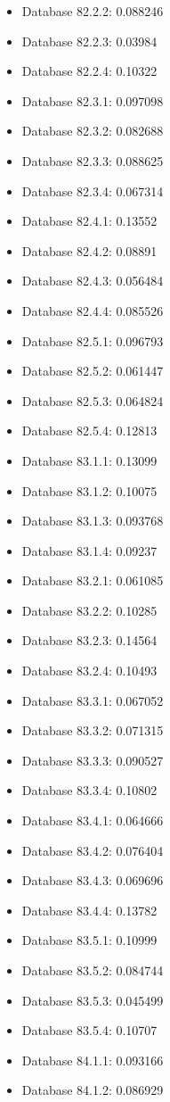 \begin{itemize}
\item Database 82.2.2: 0.088246
\item Database 82.2.3: 0.03984
\item Database 82.2.4: 0.10322
\item Database 82.3.1: 0.097098
\item Database 82.3.2: 0.082688
\item Database 82.3.3: 0.088625
\item Database 82.3.4: 0.067314
\item Database 82.4.1: 0.13552
\item Database 82.4.2: 0.08891
\item Database 82.4.3: 0.056484
\item Database 82.4.4: 0.085526
\item Database 82.5.1: 0.096793
\item Database 82.5.2: 0.061447
\item Database 82.5.3: 0.064824
\item Database 82.5.4: 0.12813
\item Database 83.1.1: 0.13099
\item Database 83.1.2: 0.10075
\item Database 83.1.3: 0.093768
\item Database 83.1.4: 0.09237
\item Database 83.2.1: 0.061085
\item Database 83.2.2: 0.10285
\item Database 83.2.3: 0.14564
\item Database 83.2.4: 0.10493
\item Database 83.3.1: 0.067052
\item Database 83.3.2: 0.071315
\item Database 83.3.3: 0.090527
\item Database 83.3.4: 0.10802
\item Database 83.4.1: 0.064666
\item Database 83.4.2: 0.076404
\item Database 83.4.3: 0.069696
\item Database 83.4.4: 0.13782
\item Database 83.5.1: 0.10999
\item Database 83.5.2: 0.084744
\item Database 83.5.3: 0.045499
\item Database 83.5.4: 0.10707
\item Database 84.1.1: 0.093166
\item Database 84.1.2: 0.086929

\end{itemize}
